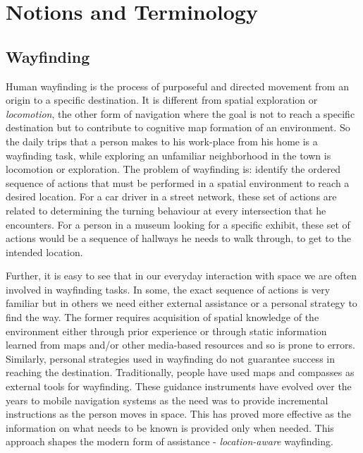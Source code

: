 \documentclass{iitkthesis}
\begin{document}
\section{Notions and Terminology}
\subsection{Wayfinding}
Human wayfinding is the process of purposeful and directed movement from 
an origin to a specific destination. It is different from spatial 
exploration or \textit{locomotion}, the other form of navigation where 
the goal is not to reach a specific destination but to contribute to 
cognitive map formation of an environment. So the daily trips that a 
person makes to his work-place from his home is a wayfinding task, while 
exploring an unfamiliar neighborhood in the town is locomotion or 
exploration. The problem of wayfinding is: identify the ordered 
sequence of actions that must be performed in a spatial environment to reach 
a desired location. For a car driver in a street network, these set of 
actions are related to determining the turning behaviour at every 
intersection that he encounters. For a person in a museum looking for a 
specific exhibit, these set of actions would be a sequence of hallways 
he needs to walk through, to get to the intended location. 

Further, it is easy to see that in our everyday interaction with space 
we are often involved in wayfinding tasks. In some, the exact sequence of 
actions is very familiar but in 
others we need either external assistance or a personal strategy to 
find the way. The former requires acquisition of spatial knowledge 
of the environment either through prior experience or through static 
information learned from maps and/or other media-based resources and so 
is prone to errors. Similarly, personal strategies used in wayfinding do 
not guarantee success in reaching the destination. Traditionally, 
people have used maps and compasses as external tools for 
wayfinding. These guidance instruments have evolved over the years to 
mobile navigation systems as the need was to provide incremental 
instructions as the person moves in space. This has 
proved more effective as the information on what needs to be known 
is provided only when needed. This approach shapes the 
modern form of assistance - \textit{location-aware} wayfinding. 
\end{document}
